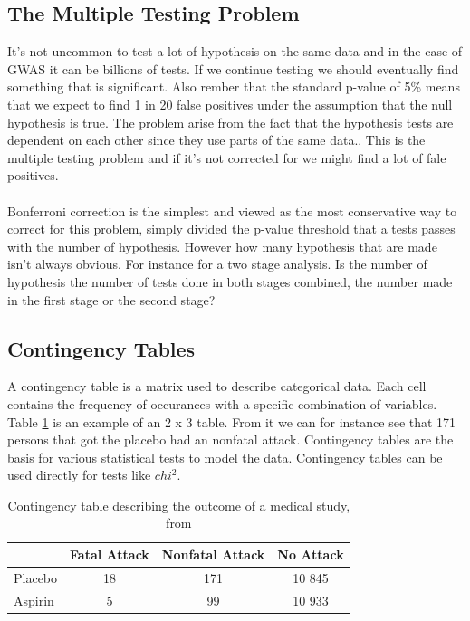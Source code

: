 \documentclass[10pt,a4paper]{article}
\begin{document}
\subsection{The Multiple Testing Problem}
It's not uncommon to test a lot of hypothesis on the same data and in the case of GWAS it can be billions of tests. If we continue testing we should eventually find something that is significant. Also rember that the standard p-value of 5\% means that we expect to find 1 in 20 false positives under the assumption that the null hypothesis is true. The problem arise from the fact that the hypothesis tests are dependent on each other since they use parts of the same data.. This is the multiple testing problem and if it's not corrected for we might find a lot of fale positives.\cite{bonferroni_multiple}\\
\\
Bonferroni correction is the simplest and viewed as the most conservative way to correct for this problem, simply divided the p-value threshold that a tests passes with the number of hypothesis. However how many hypothesis that are made isn't always obvious. For instance for a two stage analysis. Is the number of hypothesis the number of tests done in both stages combined, the number made in the first stage or the second stage?\cite{bonferroni_multiple}

\subsection{Contingency Tables}
A contingency table is a matrix used to describe categorical data. Each cell contains the frequency of occurances with a specific combination of variables. Table \ref{table:contingency_table} is an example of an 2 x 3 table. From it we can for instance see that 171 persons that got the placebo had an nonfatal attack. Contingency tables are the basis for various statistical tests to model the data. Contingency tables can be used directly for tests like $chi^2$.\cite{agresti_categorical}

\begin{table}[h]
\begin{tabular}{ l c c c }
  \hline
  & Fatal Attack & Nonfatal Attack & No Attack\\
  \hline
  Placebo & 18 & 171 & 10 845 \\
  Aspirin & 5 & 99 & 10 933 \\
  \hline  
\end{tabular}
\caption{Contingency table describing the outcome of a medical study, from \cite{agresti_categorical}}
\label{table:contingency_table}
\end{table}
\end{document}
